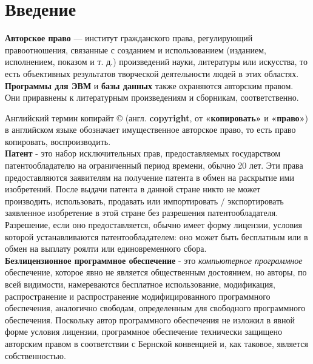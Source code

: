 \documentclass[12pt, oneside, a4paper]{article}
\begin{document}
\begin{sloppypar}
\setcounter{page}{2}

\newpage


\section{Введение}
\textbf {Авторское право} — институт гражданского права, регулирующий правоотношения, связанные с созданием и использованием (изданием, исполнением, показом и т. д.) произведений науки, литературы или искусства, то есть объективных результатов творческой деятельности людей в этих областях. \textbf {Программы для ЭВМ} и \textbf {базы данных} также охраняются авторским правом. Они приравнены к литературным произведениям и сборникам, соответственно. 
 
 Английский термин копирайт © (англ. \textbf{copyright}, от \textbf{«копировать»} и \textbf{«право»}) в английском языке обозначает имущественное авторское право, то есть право копировать, воспроизводить.\\
 
 \textbf{Патент} - это набор исключительных прав, предоставляемых государством патентообладателю на ограниченный период времени, обычно 20 лет. Эти права предоставляются заявителям на получение патента в обмен на раскрытие ими изобретений. После выдачи патента в данной стране никто не может производить, использовать, продавать или импортировать / экспортировать заявленное изобретение в этой стране без разрешения патентообладателя. Разрешение, если оно предоставляется, обычно имеет форму лицензии, условия которой устанавливаются патентообладателем: оно может быть бесплатным или в обмен на выплату роялти или единовременного сбора.\\
 
 \textbf{Безлицензионное программное обеспечение} - это \textit{компьютерное программное} обеспечение, которое явно не является общественным достоянием, но авторы, по всей видимости, намереваются бесплатное использование, модификация, распространение и распространение модифицированного программного обеспечения, аналогично свободам, определенным для свободного программного обеспечения. Поскольку автор программного обеспечения не изложил в явной форме условия лицензии, программное обеспечение технически защищено авторским правом в соответствии с Бернской конвенцией и, как таковое, является собственностью.\\
 
\newpage



\end{sloppypar}
\end{document}
